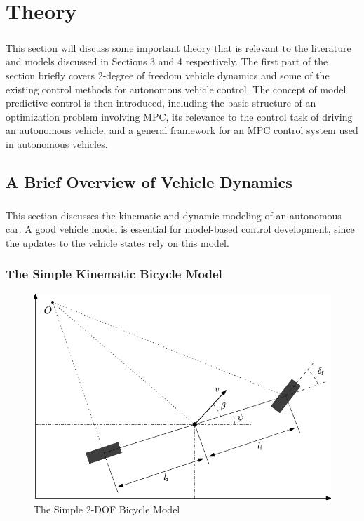 \chapter{Theory}
\paragraph{}
This section will discuss some important theory that is relevant to the literature and models discussed in Sections 3 and 4 respectively. The first part of the section briefly covers 2-degree of freedom vehicle dynamics and some of the existing control methods for autonomous vehicle control. The concept of model predictive control is then introduced, including the basic structure of an optimization problem involving MPC, its relevance to the control task of driving an autonomous vehicle, and a general framework for an MPC control system used in autonomous vehicles.

\section{A Brief Overview of Vehicle Dynamics}
\paragraph{}
This section discusses the kinematic and dynamic modeling of an autonomous car. A good vehicle model is essential for model-based control development, since the updates to the vehicle states rely on this model. 

\subsection{The Simple Kinematic Bicycle Model}
\begin{figure}[H]\label{fig2.1}
\centering \includegraphics[scale = 0.45]{Images/simple_bicycle_model.png}
\caption{The Simple 2-DOF Bicycle Model}
\end{figure}


